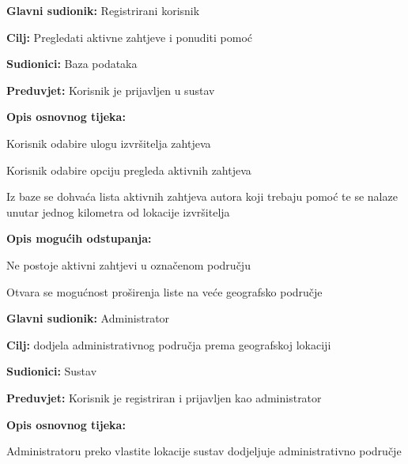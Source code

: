 \begin{packed_item}
	
	\item \textbf{Glavni sudionik: }Registrirani korisnik
	\item  \textbf{Cilj:} Pregledati aktivne zahtjeve i ponuditi pomoć
	\item  \textbf{Sudionici:} Baza podataka
	\item  \textbf{Preduvjet:} Korisnik je prijavljen u sustav
	\item  \textbf{Opis osnovnog tijeka:}
	
	\item[] \begin{packed_enum}
		
		\item Korisnik odabire ulogu izvršitelja zahtjeva
		\item Korisnik odabire opciju pregleda aktivnih zahtjeva
		\item Iz baze se dohvaća lista aktivnih zahtjeva autora koji trebaju pomoć te se nalaze unutar jednog kilometra od lokacije izvršitelja
	\end{packed_enum}
	
	\item  \textbf{Opis mogućih odstupanja:}
	
	\item[] \begin{packed_item}
		
		\item[2.a] Ne postoje aktivni zahtjevi u označenom području
		\item[] \begin{packed_enum}
			
			\item Otvara se mogućnost proširenja liste na veće geografsko područje
			
		\end{packed_enum}
	\end{packed_item}
\end{packed_item}

\noindent {}
\begin{packed_item}
	\item \textbf{Glavni sudionik: }Administrator
	\item  \textbf{Cilj:} dodjela administrativnog područja prema geografskoj lokaciji
	\item  \textbf{Sudionici:} Sustav
	\item  \textbf{Preduvjet:} Korisnik je registriran i prijavljen kao administrator
	\item  \textbf{Opis osnovnog tijeka:}
	
	\item[] \begin{packed_enum}
		
		\item Administratoru preko vlastite lokacije sustav dodjeljuje administrativno područje
	\end{packed_enum}
\end{packed_item}

